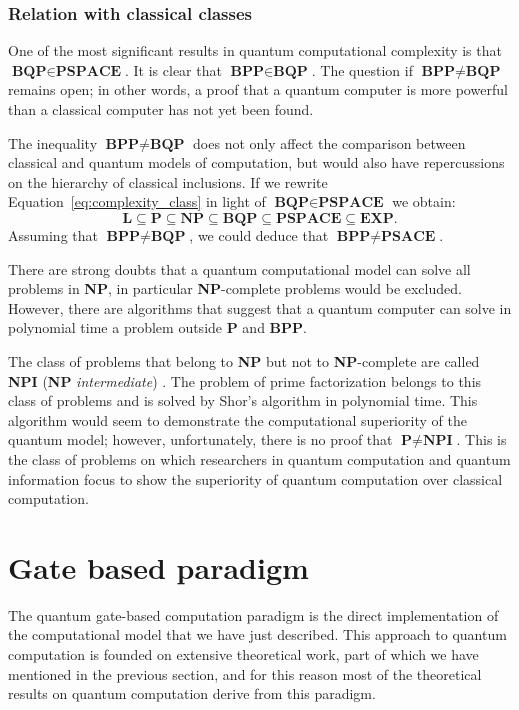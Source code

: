\subsubsection*{Relation with classical classes}
\label{sec:clas_rel}
One of the most significant results in quantum computational complexity is that $\textbf{BQP} \in \textbf{PSPACE}$. It is clear that $\textbf{BPP} \in \textbf{BQP}$. The question if $\textbf{BPP} \neq \textbf{BQP}$ remains open; in other words, a proof that a quantum computer is more powerful than a classical computer has not yet been found.

The inequality $\textbf{BPP} \neq \textbf{BQP}$ does not only affect the comparison between classical and quantum models of computation, but would also have repercussions on the hierarchy of classical inclusions. If we rewrite Equation~\ref{eq:complexity_class} in light of $\textbf{BQP} \in \textbf{PSPACE}$ we obtain:
\begin{equation}
	\textbf{L} \subseteq \textbf{P} \subseteq \textbf{NP} \subseteq \textbf{BQP}  \subseteq  \textbf{PSPACE} \subseteq \textbf{EXP}.
	\label{eq:complexity_class_q}
\end{equation}
Assuming that $\textbf{BPP} \neq \textbf{BQP}$, we could deduce that  $\textbf{BPP} \neq \textbf{PSACE}$.

There are strong doubts that a quantum computational model can solve all problems in \textbf{NP}, in particular \textbf{NP}-complete problems would be excluded. However, there are algorithms that suggest that a quantum computer can solve in polynomial time a problem outside \textbf{P} and \textbf{BPP}.

The class of problems that belong to \textbf{NP} but not to \textbf{NP}-complete are called \textbf{NPI} (\textbf{NP} \emph{intermediate}) . The problem of prime factorization belongs to this class of problems and is solved by Shor's algorithm in polynomial time. This algorithm would seem to demonstrate the computational superiority of the quantum model; however, unfortunately, there is no proof that $\textbf{P} \neq \textbf{NPI}$. This is the class of problems on which researchers in quantum computation and quantum information focus to show the superiority of quantum computation over classical computation.

\section{Gate based paradigm}
The quantum gate-based computation paradigm is the direct implementation of the computational model that we have just described. This approach to quantum computation is founded on extensive theoretical work, part of which we have mentioned in the previous section, and for this reason most of the theoretical results on quantum computation derive from this paradigm.

